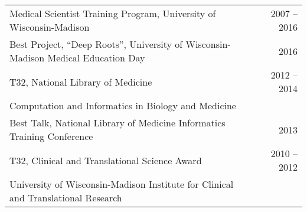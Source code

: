 \begin{tabular}{ @{} l @{\hspace{2ex}} r }
Medical Scientist Training Program, University of Wisconsin-Madison & \hfill 2007 -- 2016\\
Best Project, ``Deep Roots'', University of Wisconsin-Madison Medical Education Day &\hfill 2016\\
T32, National Library of Medicine & 2012 -- 2014 \\
  \hspace{2em} Computation and Informatics in Biology and Medicine & \\
Best Talk, National Library of Medicine Informatics Training Conference & 2013 \\
T32, Clinical and Translational Science Award & 2010 -- 2012 \\
  \hspace{2em} University of Wisconsin-Madison Institute for Clinical and Translational Research &\\
  


\end{tabular}
